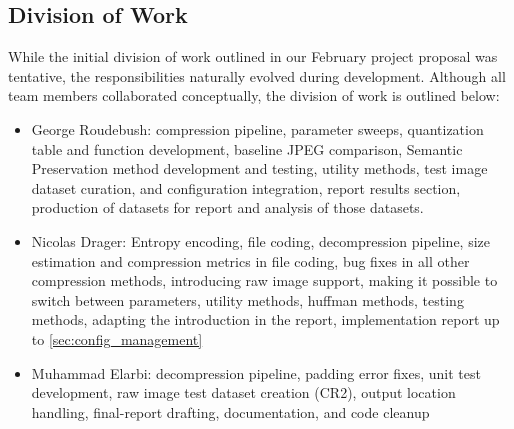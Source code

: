 \subsection{Division of Work}
\label{sec:division-of-work}

While the initial division of work outlined in our February project proposal was tentative, the responsibilities naturally evolved during development. Although all team members collaborated conceptually, the division of work is outlined below:
\begin{itemize}
  \item George Roudebush: compression pipeline, parameter sweeps, quantization table and function development, baseline JPEG comparison, Semantic Preservation method development and testing, utility methods, test image dataset curation, and configuration integration, report results section, production of datasets for report and analysis of those datasets.
  \item Nicolas Drager: Entropy encoding, file coding, decompression pipeline, size estimation and compression metrics in file coding, bug fixes in all other compression methods, introducing raw image support, making it possible to switch between parameters, utility methods, huffman methods, testing methods, adapting the introduction in the report, implementation report up to \ref{sec:config_management}
  \item Muhammad Elarbi: decompression pipeline, padding error fixes, unit test development, raw image test dataset creation (CR2), output location handling, final-report drafting, documentation, and code cleanup
\end{itemize}